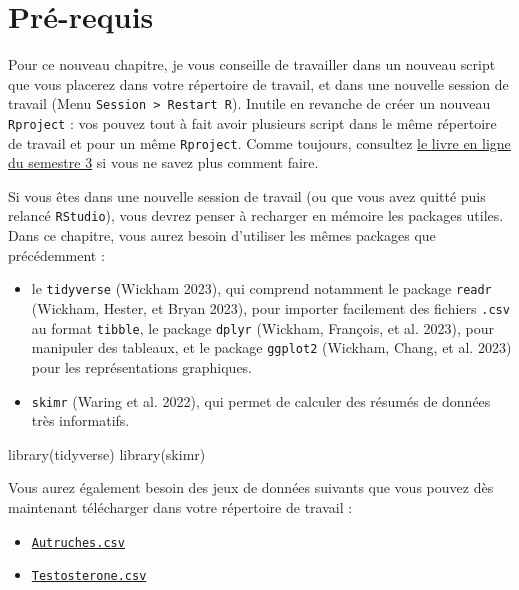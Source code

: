 \documentclass[
  a4paper,
  DIV=11,
  numbers=noendperiod,
  oneside]{scrreprt}
\newenvironment{Shaded}{}{}
\newcommand{\FunctionTok}[1]{\textcolor[rgb]{0.44,0.26,0.76}{#1}}
\newcommand{\NormalTok}[1]{\textcolor[rgb]{0.14,0.16,0.18}{#1}}
\providecommand{\tightlist}{%
  \setlength{\itemsep}{0pt}\setlength{\parskip}{0pt}}\usepackage{longtable,booktabs,array}
\begin{document}
\hypertarget{sec-packages2}{%
\section{Pré-requis}\label{sec-packages2}}

Pour ce nouveau chapitre, je vous conseille de travailler dans un
nouveau script que vous placerez dans votre répertoire de travail, et
dans une nouvelle session de travail (Menu
\texttt{Session\ \textgreater{}\ Restart\ R}). Inutile en revanche de
créer un nouveau \texttt{Rproject} : vos pouvez tout à fait avoir
plusieurs script dans le même répertoire de travail et pour un même
\texttt{Rproject}. Comme toujours, consultez
\href{https://besibo.github.io/BiometrieS3/01-R-basics.html\#sec-code}{le
livre en ligne du semestre 3} si vous ne savez plus comment faire.

Si vous êtes dans une nouvelle session de travail (ou que vous avez
quitté puis relancé \texttt{RStudio}), vous devrez penser à recharger en
mémoire les packages utiles. Dans ce chapitre, vous aurez besoin
d'utiliser les mêmes packages que précédemment :

\begin{itemize}
\tightlist
\item
  le \texttt{tidyverse} (Wickham 2023), qui comprend notamment le
  package \texttt{readr} (Wickham, Hester, et Bryan 2023), pour importer
  facilement des fichiers \texttt{.csv} au format \texttt{tibble}, le
  package \texttt{dplyr} (Wickham, François, et al. 2023), pour
  manipuler des tableaux, et le package \texttt{ggplot2} (Wickham,
  Chang, et al. 2023) pour les représentations graphiques.
\item
  \texttt{skimr} (Waring et al. 2022), qui permet de calculer des
  résumés de données très informatifs.
\end{itemize}

\begin{Shaded}
\begin{Highlighting}[]
\FunctionTok{library}\NormalTok{(tidyverse)}
\FunctionTok{library}\NormalTok{(skimr)}
\end{Highlighting}
\end{Shaded}

Vous aurez également besoin des jeux de données suivants que vous pouvez
dès maintenant télécharger dans votre répertoire de travail :

\begin{itemize}
\tightlist
\item
  \href{data/Autruches.csv}{\texttt{Autruches.csv}}
\item
  \href{data/Testosterone.csv}{\texttt{Testosterone.csv}}
\end{itemize}
\end{document}

